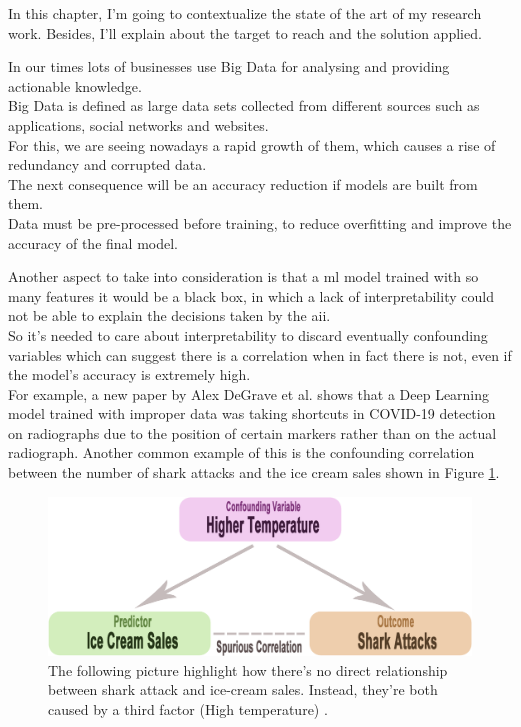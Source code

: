 In this chapter, I'm going to contextualize the state of the art of my research work. 
Besides, I'll explain about the target to reach and the solution applied.\par
In our times lots of businesses use Big Data for analysing and providing actionable knowledge.\\
Big Data is defined as large data sets collected from different sources such as applications, social networks and websites.\\
For this, we are seeing nowadays a rapid growth of them, which causes a rise of redundancy and corrupted data.\\
The next consequence will be an accuracy reduction if models are built from them.\\
Data must be pre-processed before training, to reduce overfitting and improve the accuracy of the final model.\par
Another aspect to take into consideration is that a \acrshort{ml} model trained with so many features it would be a black box, in which a lack of interpretability could not be able to explain the decisions taken by the \gls{aii}.\\
So it's needed to care about interpretability to discard eventually confounding variables which can suggest there is a correlation when in fact there is not, even if the model's accuracy is extremely high.\\
For example, a new paper by Alex DeGrave et al. \cite{degrave2021ai} shows that a Deep Learning model trained with improper data was taking shortcuts in COVID-19 detection on radiographs due to the position of certain markers rather than on the actual radiograph.
Another common example of this is the confounding correlation between the number of shark attacks and the ice cream sales shown in Figure \ref{fig:shark}.\newline
\begin{figure}[H]
    \centering
    \includegraphics[scale=0.25]{images/confounding.png}
    \caption{The following picture \cite{shark-icecream} highlight how there's no direct relationship between shark attack and ice-cream sales. Instead, they're both caused by a third factor (High temperature) \cite{siegel2019ice}.}
    \label{fig:shark}
\end{figure}
